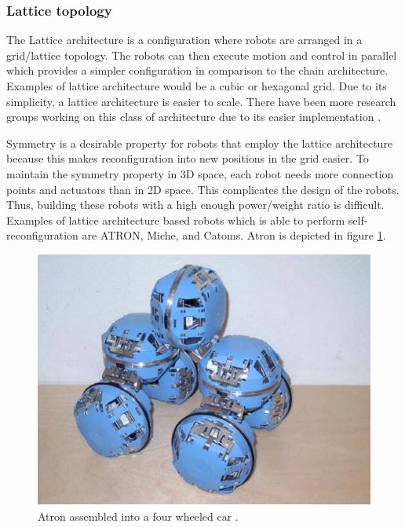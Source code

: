 \subsubsection{Lattice topology}
The Lattice architecture is a configuration where robots are arranged in a grid/lattice topology.
The robots can then execute motion and control in parallel which provides a simpler configuration in comparison to the chain architecture. 
Examples of lattice architecture would be a cubic or hexagonal grid.
Due to its simplicity, a lattice architecture is easier to scale. 
There have been more research groups working on this class of architecture due to its easier implementation \cite{yim_modular_2002}.

Symmetry is a desirable property for robots that employ the lattice architecture because this makes reconfiguration into new positions in the grid easier.
To maintain the symmetry property in 3D space, each robot needs more connection points and actuators than in 2D space\cite{murata_self-reconfigurable_2007}.
This complicates the design of the robots. 
Thus, building these robots with a high enough power/weight ratio is difficult.
Examples of lattice architecture based robots which is able to perform self-reconfiguration are ATRON\cite{brandt_atron_2007}, Miche\cite{gilpin_miche:_2008}, and Catoms\cite{kirby_catoms:_2005}.
Atron is depicted in figure \ref{fig:atron}.

\begin{figure}[H]
	\centering
	\includegraphics[scale=0.5]{chapters/res/Atron.png}
	\caption{Atron assembled into a four wheeled car \cite{brandt_atron_2007}.}
	\label{fig:atron}
\end{figure}

